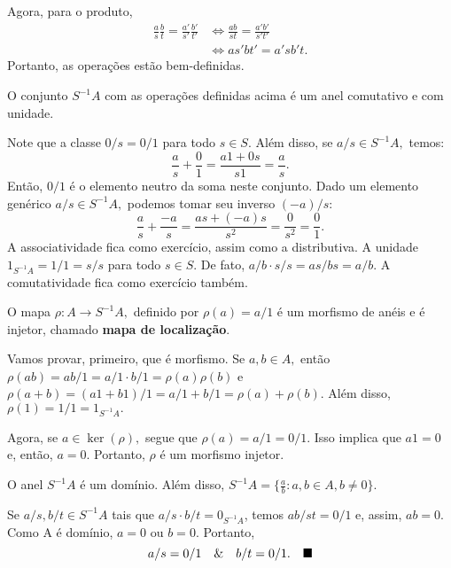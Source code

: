 \documentclass[algebraII_notes.tex]{subfiles}
\begin{document}
Agora, para o produto,
\begin{align*}
	\frac{a}{s}\frac{b}{t} = \frac{a'}{s'}\frac{b'}{t'} & \Longleftrightarrow \frac{ab}{st}=\frac{a'b'}{s't'} \\
	                                                    & \Longleftrightarrow as'bt' = a'sb't.
\end{align*}
Portanto, as operações estão bem-definidas.
\begin{prop*}
	O conjunto \(S^{-1}A\) com as operações definidas acima é um anel comutativo e com unidade.
\end{prop*}
\begin{proof*}
	Note que a classe \(0/s = 0/1\) para todo \(s\in S\). Além disso, se \(a/s\in S^{-1}A,\) temos:
	\[
		\frac{a}{s}+\frac{0}{1} = \frac{a1 + 0s}{s1} = \frac{a}{s}.
	\]
	Então, \(0/1\) é o elemento neutro da soma neste conjunto. Dado um elemento genérico \(a/s\in S^{-1}A,\) podemos tomar seu inverso \((-a)/s:\)
	\[
		\frac{a}{s}+\frac{-a}{s} = \frac{as + (-a)s}{s^{2}} = \frac{0}{s^{2}} = \frac{0}{1}.
	\]
	A associatividade fica como exercício, assim como a distributiva. A unidade \(1_{S^{-1}A} = 1/1 = s/s \) para todo \(s\in S\). De fato,
	\(a/b \cdot s/s = as/bs = a/b\). A comutatividade fica como exercício também. \qedsymbol
\end{proof*}
\begin{lemma*}
	O mapa \(\rho :A\rightarrow S^{-1}A,\) definido por \(\rho (a) = a/1\) é um morfismo de anéis e é injetor, chamado \textbf{mapa de localização}.
\end{lemma*}
\begin{proof*}
	Vamos provar, primeiro, que é morfismo. Se \(a, b\in A,\) então \(\rho (ab) = ab/1 = a/1 \cdot b/1 = \rho (a)\rho (b)\) e \(\rho (a+b) = (a1+b1)/1 = a/1 + b/1 = \rho (a) + \rho (b).\)
	Além disso, \(\rho (1) = 1/1 = 1_{S^{-1}A}.\)

	Agora, se \(a\in\ker{(\rho )},\) segue que \(\rho (a) = a/1 = 0/1.\) Isso implica que \(a1 = 0\) e, então, \(a = 0.\) Portanto,
	\(\rho \) é um morfismo injetor. \qedsymbol
\end{proof*}
\begin{prop*}
	O anel \(S^{-1}A\) é um domínio. Além disso, \(S^{-1}A = \biggl\{\frac{a}{b}: a, b\in A, b\neq 0\biggr\}\).
\end{prop*}
\begin{proof*}
	Se \(a/s, b/t\in S^{-1}A\) tais que \(a/s \cdot b/t = 0_{S^{-1}A}\), temos \(ab/st = 0/1\) e, assim,
	\(ab = 0.\) Como A é domínio, \(a = 0\) ou \(b = 0\). Portanto,
	\[
		a/s = 0/1\quad\&\quad b/t = 0/1.\quad \text{$\blacksquare$}
	\]
\end{proof*}
\end{document}
